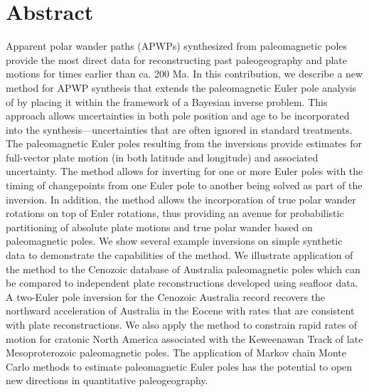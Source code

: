 \documentclass[11pt,letterpaper]{article}
\begin{document}
\section*{Abstract \label{sec:ABSTRACT}}
Apparent polar wander paths (APWPs) synthesized from paleomagnetic poles provide the most direct data for reconstructing past paleogeography and plate motions for times earlier than ca. 200 Ma. In this contribution, we describe a new method for APWP synthesis that extends the paleomagnetic Euler pole analysis of \cite{Gordon1984a} by placing it within the framework of a Bayesian inverse problem. This approach allows uncertainties in both pole position and age to be incorporated into the synthesis---uncertainties that are often ignored in standard treatments. The paleomagnetic Euler poles resulting from the inversions provide estimates for full-vector plate motion (in both latitude and longitude) and associated uncertainty. The method allows for inverting for one or more Euler poles with the timing of changepoints from one Euler pole to another being solved as part of the inversion. In addition, the method allows the incorporation of true polar wander rotations on top of Euler rotations, thus providing an avenue for probabilistic partitioning of absolute plate motions and true polar wander based on paleomagnetic poles. We show several example inversions on simple synthetic data to demonstrate the capabilities of the method. We illustrate application of the method to the Cenozoic database of Australia paleomagnetic poles which can be compared to independent plate reconstructions developed using seafloor data. A two-Euler pole inversion for the Cenozoic Australia record recovers the northward acceleration of Australia in the Eocene with rates that are consistent with plate reconstructions. We also apply the method to constrain rapid rates of motion for cratonic North America associated with the Keweenawan Track of late Mesoproterozoic paleomagnetic poles. The application of Markov chain Monte Carlo methods to estimate paleomagnetic Euler poles has the potential to open new directions in quantitative paleogeography.
\end{document}
